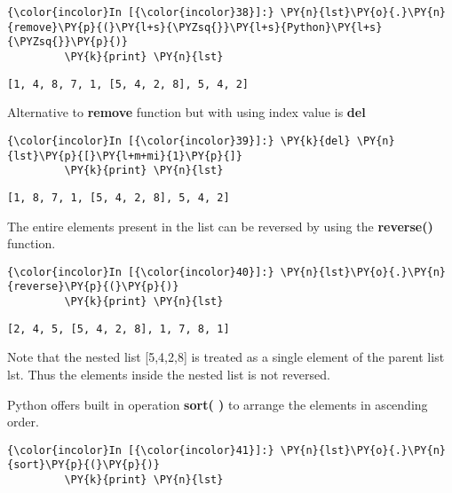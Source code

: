     \begin{Verbatim}[commandchars=\\\{\}]
{\color{incolor}In [{\color{incolor}38}]:} \PY{n}{lst}\PY{o}{.}\PY{n}{remove}\PY{p}{(}\PY{l+s}{\PYZsq{}}\PY{l+s}{Python}\PY{l+s}{\PYZsq{}}\PY{p}{)}
         \PY{k}{print} \PY{n}{lst}
\end{Verbatim}

    \begin{Verbatim}[commandchars=\\\{\}]
[1, 4, 8, 7, 1, [5, 4, 2, 8], 5, 4, 2]
    \end{Verbatim}

    Alternative to \textbf{remove} function but with using index value is
\textbf{del}

    \begin{Verbatim}[commandchars=\\\{\}]
{\color{incolor}In [{\color{incolor}39}]:} \PY{k}{del} \PY{n}{lst}\PY{p}{[}\PY{l+m+mi}{1}\PY{p}{]}
         \PY{k}{print} \PY{n}{lst}
\end{Verbatim}

    \begin{Verbatim}[commandchars=\\\{\}]
[1, 8, 7, 1, [5, 4, 2, 8], 5, 4, 2]
    \end{Verbatim}

    The entire elements present in the list can be reversed by using the
\textbf{reverse()} function.

    \begin{Verbatim}[commandchars=\\\{\}]
{\color{incolor}In [{\color{incolor}40}]:} \PY{n}{lst}\PY{o}{.}\PY{n}{reverse}\PY{p}{(}\PY{p}{)}
         \PY{k}{print} \PY{n}{lst}
\end{Verbatim}

    \begin{Verbatim}[commandchars=\\\{\}]
[2, 4, 5, [5, 4, 2, 8], 1, 7, 8, 1]
    \end{Verbatim}

    Note that the nested list {[}5,4,2,8{]} is treated as a single element
of the parent list lst. Thus the elements inside the nested list is not
reversed.

Python offers built in operation \textbf{sort( )} to arrange the
elements in ascending order.

    \begin{Verbatim}[commandchars=\\\{\}]
{\color{incolor}In [{\color{incolor}41}]:} \PY{n}{lst}\PY{o}{.}\PY{n}{sort}\PY{p}{(}\PY{p}{)}
         \PY{k}{print} \PY{n}{lst}
\end{Verbatim}

